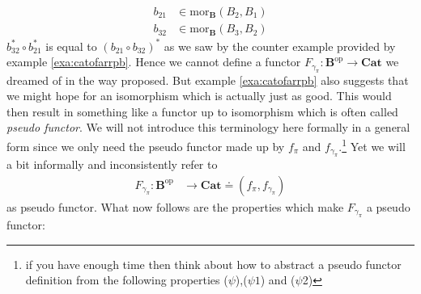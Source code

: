 \begin{align*}
  b_{21}
  &\in
  \mathrm{mor}_{\mathbf{B}}(B_{2},B_{1})
  \\
  b_{32}
  &\in
  \mathrm{mor}_{\mathbf{B}}(B_{3},B_{2})
\end{align*}
$b_{32}^{\ast} \circ b_{21}^{\ast}$ is equal to $(b_{21} \circ b_{32})^{\ast}$ as we saw by the counter example provided by example \ref{exa:catofarrpb}. Hence we cannot define a functor $F_{\gamma_{\pi}} \colon \mathbf{B}^{\mathrm{op}} \rightarrow \mathbf{Cat}$ we dreamed of in the way proposed. But example \ref{exa:catofarrpb} also suggests that we might hope for an isomorphism which is actually just as good. This would then result in something like a functor up to isomorphism which is often called \textit{pseudo functor}. We will not introduce this terminology here formally in a general form since we only need the pseudo functor made up by $f_{\pi}$ and $f_{\gamma_{\pi}}$.\footnote{if you have enough time then think about how to abstract a pseudo functor definition from the following properties ($\psi$),($\psi1$) and ($\psi$2)} Yet we will a bit informally and inconsistently refer to
\begin{align*}
  F_{\gamma_{\pi}}
  \colon
  \mathbf{B}^{\mathrm{op}}
  &\rightarrow
  \mathbf{Cat}
  \doteq
  \left(
    f_{\pi},
    f_{\gamma_{\pi}}
  \right)
\end{align*}
as pseudo functor. What now follows are the properties which make $F_{\gamma_{\pi}}$ a pseudo functor:
